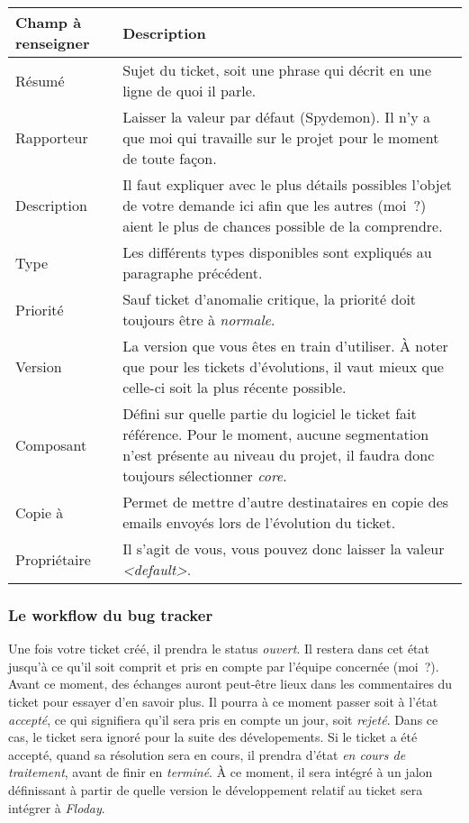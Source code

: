 \begin{tabular}{|p{3cm}|p{10cm}|}
	\hline
	Champ à renseigner & Description\\
	\hline
	Résumé & Sujet du ticket, soit une phrase qui décrit en une ligne de quoi il parle.\\
	Rapporteur & Laisser la valeur par défaut (Spydemon). Il n'y a que moi qui travaille sur le projet pour le moment de toute façon.\\
	Description & Il faut expliquer avec le plus détails possibles l'objet de votre demande ici afin que les autres (moi~?) aient le plus de chances possible de la comprendre.\\
	Type & Les différents types disponibles sont expliqués au paragraphe précédent.\\
	Priorité & Sauf ticket d'anomalie critique, la priorité doit toujours être à \emph{normale}.\\
	Version & La version que vous êtes en train d'utiliser. À noter que pour les tickets d'évolutions, il vaut mieux que celle-ci soit la plus récente possible.\\
	Composant & Défini sur quelle partie du logiciel le ticket fait référence. Pour le moment, aucune segmentation n'est présente au niveau du projet, il faudra donc toujours sélectionner \emph{core}.\\
	Copie à & Permet de mettre d'autre destinataires en copie des emails envoyés lors de l'évolution du ticket.\\
	Propriétaire & Il s'agit de vous, vous pouvez donc laisser la valeur \emph{<default>}.\\
	\hline
\end{tabular}
\newline

\subsubsection{Le workflow du bug tracker}

Une fois votre ticket créé, il prendra le status \emph{ouvert}.
Il restera dans cet état jusqu'à ce qu'il soit comprit et pris en compte par l'équipe concernée (moi~?).
Avant ce moment, des échanges auront peut-être lieux dans les commentaires du ticket pour essayer d'en savoir plus.
Il pourra à ce moment passer soit à l'état \emph{accepté}, ce qui signifiera qu'il sera pris en compte un jour, soit \emph{rejeté}.
Dans ce cas, le ticket sera ignoré pour la suite des dévelopements.
Si le ticket a été accepté, quand sa résolution sera en cours, il prendra d'état \emph{en cours de traitement}, avant de finir en \emph{terminé}.
À ce moment, il sera intégré à un jalon définissant à partir de quelle version le développement relatif au ticket sera intégrer à \emph{Floday}.
